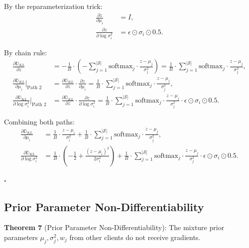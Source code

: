 By the reparameterization trick:
\begin{align}
\frac{\partial z}{\partial \mu_i} &= I, \\
\frac{\partial z}{\partial \log\sigma_i^2} &= \epsilon \odot \sigma_i \odot 0.5.
\end{align}

By chain rule:
\begin{align}
\frac{\partial \mathbb{D}_{KL}}{\partial z} &= -\frac{1}{B} \cdot \left( -\sum_{j=1}^{|\mathcal{S}|} \text{softmax}_j \cdot \frac{z - \mu_j}{\sigma_j^2} \right) = \frac{1}{B} \cdot \sum_{j=1}^{|\mathcal{S}|} \text{softmax}_j \cdot \frac{z - \mu_j}{\sigma_j^2}, \\
\frac{\partial \mathbb{D}_{KL}}{\partial \mu_i} \Big|_{\text{Path 2}} &= \frac{\partial \mathbb{D}_{KL}}{\partial z} \cdot \frac{\partial z}{\partial \mu_i} = \frac{1}{B} \cdot \sum_{j=1}^{|\mathcal{S}|} \text{softmax}_j \cdot \frac{z - \mu_j}{\sigma_j^2}, \\
\frac{\partial \mathbb{D}_{KL}}{\partial \log\sigma_i^2} \Big|_{\text{Path 2}} &= \frac{\partial \mathbb{D}_{KL}}{\partial z} \cdot \frac{\partial z}{\partial \log\sigma_i^2} = \frac{1}{B} \cdot \sum_{j=1}^{|\mathcal{S}|} \text{softmax}_j \cdot \frac{z - \mu_j}{\sigma_j^2} \cdot \epsilon \odot \sigma_i \odot 0.5.
\end{align}

Combining both paths:
\begin{align}
\frac{\partial \mathbb{D}_{KL}}{\partial \mu_i} &= \frac{1}{B} \cdot \frac{z - \mu_i}{\sigma_i^2} + \frac{1}{B} \cdot \sum_{j=1}^{|\mathcal{S}|} \text{softmax}_j \cdot \frac{z - \mu_j}{\sigma_j^2}, \\
\frac{\partial \mathbb{D}_{KL}}{\partial \log\sigma_i^2} &= \frac{1}{B} \cdot \left( -\frac{1}{2} + \frac{(z - \mu_i)^2}{2\sigma_i^2} \right) + \frac{1}{B} \cdot \sum_{j=1}^{|\mathcal{S}|} \text{softmax}_j \cdot \frac{z - \mu_j}{\sigma_j^2} \cdot \epsilon \odot \sigma_i \odot 0.5.
\end{align}

$\square$

\subsection{Prior Parameter Non-Differentiability}

\textbf{Theorem 7} (Prior Parameter Non-Differentiability): The mixture prior parameters $\mu_j, \sigma_j^2, w_j$ from other clients do not receive gradients.

